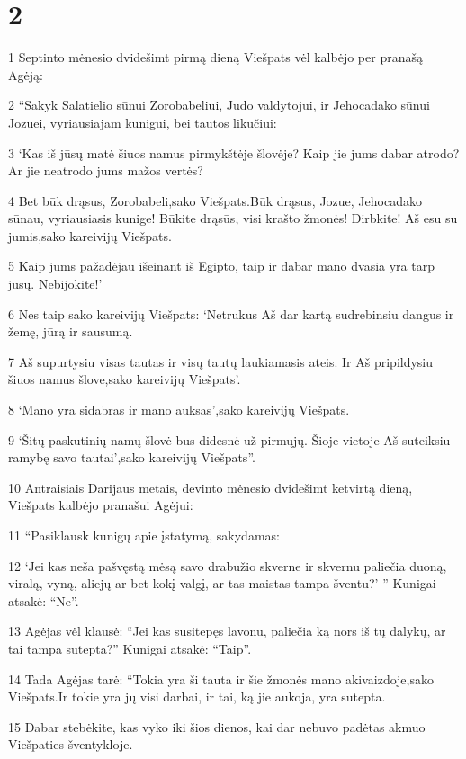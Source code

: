 \chapter{2}


\par 1 Septinto mėnesio dvidešimt pirmą dieną Viešpats vėl kalbėjo per pranašą Agėją: 
\par 2 “Sakyk Salatielio sūnui Zorobabeliui, Judo valdytojui, ir Jehocadako sūnui Jozuei, vyriausiajam kunigui, bei tautos likučiui: 
\par 3 ‘Kas iš jūsų matė šiuos namus pirmykštėje šlovėje? Kaip jie jums dabar atrodo? Ar jie neatrodo jums mažos vertės? 
\par 4 Bet būk drąsus, Zorobabeli,­sako Viešpats.­Būk drąsus, Jozue, Jehocadako sūnau, vyriausiasis kunige! Būkite drąsūs, visi krašto žmonės! Dirbkite! Aš esu su jumis,­sako kareivijų Viešpats.­ 
\par 5 Kaip jums pažadėjau išeinant iš Egipto, taip ir dabar mano dvasia yra tarp jūsų. Nebijokite!’ 
\par 6 Nes taip sako kareivijų Viešpats: ‘Netrukus Aš dar kartą sudrebinsiu dangus ir žemę, jūrą ir sausumą. 
\par 7 Aš supurtysiu visas tautas ir visų tautų laukiamasis ateis. Ir Aš pripildysiu šiuos namus šlove,­sako kareivijų Viešpats’. 
\par 8 ‘Mano yra sidabras ir mano­ auksas’,­sako kareivijų Viešpats. 
\par 9 ‘Šitų paskutinių namų šlovė bus didesnė už pirmųjų. Šioje vietoje Aš suteiksiu ramybę savo tautai’,­sako kareivijų Viešpats”. 
\par 10 Antraisiais Darijaus metais, devinto mėnesio dvidešimt ketvirtą dieną, Viešpats kalbėjo pranašui Agėjui: 
\par 11 “Pasiklausk kunigų apie įstatymą, sakydamas: 
\par 12 ‘Jei kas neša pašvęstą mėsą savo drabužio skverne ir skvernu paliečia duoną, viralą, vyną, aliejų ar bet kokį valgį, ar tas maistas tampa šventu?’ ” Kunigai atsakė: “Ne”. 
\par 13 Agėjas vėl klausė: “Jei kas susitepęs lavonu, paliečia ką nors iš tų dalykų, ar tai tampa sutepta?” Kunigai atsakė: “Taip”. 
\par 14 Tada Agėjas tarė: “Tokia yra ši tauta ir šie žmonės mano akivaizdoje,­sako Viešpats.­Ir tokie yra jų visi darbai, ir tai, ką jie aukoja, yra sutepta. 
\par 15 Dabar stebėkite, kas vyko iki šios dienos, kai dar nebuvo padėtas akmuo Viešpaties šventykloje. 
